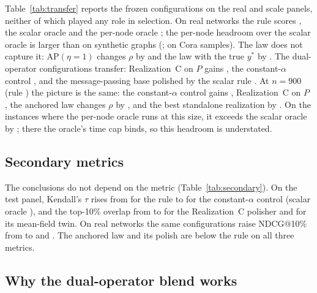 \documentclass[11pt,a4paper]{article}
\theoremstyle{definition}
\theoremstyle{plain}
\newcommand{\AP}{\mathrm{AP}}
\begin{document}
Table~\ref{tab:transfer} reports the frozen configurations on the real and scale panels, neither of which played any role in selection. On real networks the rule scores \RealRule, the scalar oracle \RealOracleScalar{} and the per-node oracle \RealOraclePernode; the per-node headroom over the scalar oracle is larger than on synthetic graphs (\RealHeadroom; \RealHeadCora{} on Cora samples). The law does not capture it: $\AP(\eta=1)$ changes $\rho$ by \RealAPoneD{} and the law with the true $y^*$ by \RealTruePropD. The dual-operator configurations transfer: Realization~C on $P$ gains \RealPBXbestD, the constant-$\alpha$ control \RealLinNineD{} \RealLinNineCI, and the message-passing base polished by the scalar rule \RealMPzeroD. At $n=900$ (rule \ScaleRule) the picture is the same: the constant-$\alpha$ control gains \ScaleLinNineD, Realization~C on $P$ \ScalePBXbestD, the anchored law changes $\rho$ by \ScaleAPoneD, and the best standalone realization by \ScaleCbestD. On the \NPernodeScale{} instances where the per-node oracle runs at this size, it exceeds the scalar oracle by \ScaleHeadroom; there the oracle's time cap binds, so this headroom is understated.

\TabTransfer

\subsection{Secondary metrics}\label{sec:secondary}

The conclusions do not depend on the metric (Table~\ref{tab:secondary}). On the test panel, Kendall's $\tau$ rises from \SecTestRuleTau{} for the rule to \SecTestLinNineTau{} for the constant-$\alpha$ control (scalar oracle \SecTestOracleScalarTau), and the top-10\% overlap from \SecTestRuleTop{} to \SecTestPBXbestTop{} for the Realization~C polisher and \SecTestCmeanTop{} for its mean-field twin. On real networks the same configurations raise NDCG@10\% from \SecRealRuleNdcg{} to \SecRealPBXbestNdcg{} and \SecRealCmeanNdcg. The anchored law and its polish are below the rule on all three metrics.

\TabSecondary

\subsection{Why the dual-operator blend works}\label{sec:complement}
\end{document}
